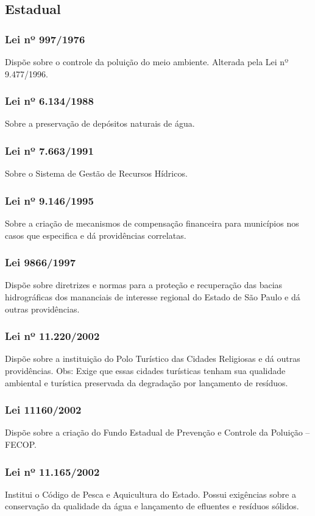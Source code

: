 \begin{subapend}
	\subsection{Estadual}
	\begin{subsubapend}
		\item \subsubsection{Lei nº 997/1976}
		Dispõe sobre o controle da poluição do meio ambiente. Alterada pela Lei nº 9.477/1996.
		\subsubsection{Lei nº 6.134/1988}
		Sobre a preservação de depósitos naturais de água.
		\subsubsection{Lei nº 7.663/1991}
		Sobre o Sistema de Gestão de Recursos Hídricos.
		\subsubsection{Lei nº 9.146/1995}
		Sobre a criação de mecanismos de compensação financeira para municípios nos casos que especifica e dá providências correlatas.
		\subsubsection{Lei 9866/1997}
		Dispõe sobre diretrizes e normas para a proteção e recuperação das bacias hidrográficas dos mananciais de interesse regional do Estado de São Paulo e dá outras providências.
		\subsubsection{Lei nº 11.220/2002}
		Dispõe sobre a instituição do Polo Turístico das Cidades Religiosas e dá outras providências. Obs: Exige que essas cidades turísticas tenham sua qualidade ambiental e turística preservada da degradação por lançamento de resíduos.
		\subsubsection{Lei 11160/2002}
		Dispõe sobre a criação do Fundo Estadual de Prevenção e Controle da Poluição – FECOP.
		\subsubsection{Lei nº 11.165/2002}
		Institui o Código de Pesca e Aquicultura do Estado. Possui exigências sobre a conservação da qualidade da água e lançamento de efluentes e resíduos sólidos.

\end{subsubapend}
\end{subapend}
